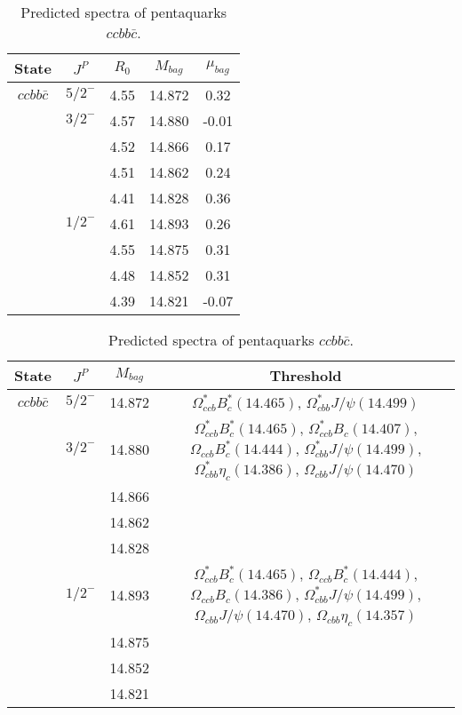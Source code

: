 \documentclass[prd,twocolumn,floatfix,nofootinbib]{revtex4}
\begin{document}
\renewcommand{\tabcolsep}{0.5cm}
\renewcommand{\arraystretch}{1.2}
\begin{table*}[!htbp]
    \caption{Predicted spectra of pentaquarks $ccbb\bar{c}$.}
    \begin{tabular}{ccccc}
        \hline\hline
        {\rm State} &$J^{P}$ &$R_{0}$ &$M_{bag}$ &$\mu_{bag}$ \\ \hline
        ${ccbb\bar{c}}$
        &${5/2}^{-}$    &4.55   &14.872 &0.32 \\
        &${3/2}^{-}$    &4.57   &14.880 &-0.01 \\
        &               &4.52   &14.866 &0.17 \\
        &               &4.51   &14.862 &0.24 \\
        &               &4.41   &14.828 &0.36 \\
        &${1/2}^{-}$    &4.61   &14.893 &0.26 \\
        &               &4.55   &14.875 &0.31 \\
        &               &4.48   &14.852 &0.31 \\
        &               &4.39   &14.821 &-0.07 \\
        \hline\hline
    \end{tabular}
\end{table*}

\renewcommand{\tabcolsep}{0.5cm}
\renewcommand{\arraystretch}{1.2}
\begin{table*}[!htbp]
    \caption{Predicted spectra of pentaquarks $ccbb\bar{c}$.}
    \begin{tabular}{cccc}
        \hline\hline
        {\rm State} &$J^{P}$ &$M_{bag}$ &Threshold \\ \hline
        ${ccbb\bar{c}}$
        &${5/2}^{-}$    &14.872 &$\Omega^{\ast}_{ccb} B^{\ast}_{c}(14.465)$, $\Omega^{\ast}_{cbb} J/\psi(14.499)$ \\
        &${3/2}^{-}$    &14.880 &$\Omega^{\ast}_{ccb} B^{\ast}_{c}(14.465)$, $\Omega^{\ast}_{ccb} B_{c}(14.407)$, $\Omega_{ccb} B^{\ast}_{c}(14.444)$, $\Omega^{\ast}_{cbb} J/\psi(14.499)$, $\Omega^{\ast}_{cbb} \eta_{c}(14.386)$, $\Omega_{cbb} J/\psi(14.470)$ \\
        &               &14.866 & \\
        &               &14.862 & \\
        &               &14.828 & \\
        &${1/2}^{-}$    &14.893 &$\Omega^{\ast}_{ccb} B^{\ast}_{c}(14.465)$, $\Omega_{ccb} B^{\ast}_{c}(14.444)$, $\Omega_{ccb} B_{c}(14.386)$, $\Omega^{\ast}_{cbb} J/\psi(14.499)$, $\Omega_{cbb} J/\psi(14.470)$, $\Omega_{cbb} \eta_{c}(14.357)$ \\
        &               &14.875 & \\
        &               &14.852 & \\
        &               &14.821 & \\
        \hline\hline
    \end{tabular}
\end{table*}
\end{document}
